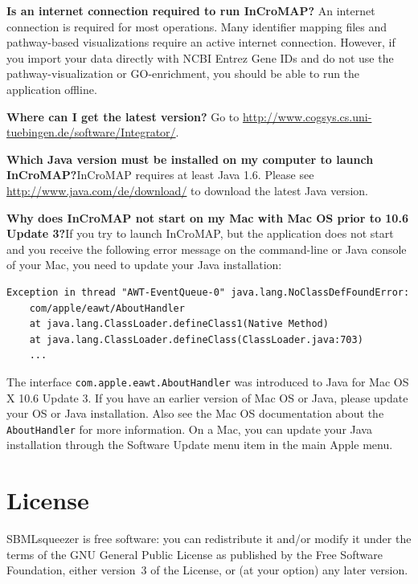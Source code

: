 \noindent \textbf{Is an internet connection required to run InCroMAP?}\newline
An internet connection is required for most operations. Many identifier mapping
files and pathway-based visualizations require an active internet connection.
However, if you import your data directly with NCBI Entrez Gene IDs and do not
use the pathway-visualization or GO-enrichment, you should be able to run the
application offline.\newline

\noindent \textbf{Where can I get the latest version?}\newline
Go to \url{http://www.cogsys.cs.uni-tuebingen.de/software/Integrator/}.\newline

\noindent \textbf{Which Java version must be installed on my computer to launch
InCroMAP?}\newline InCroMAP requires at least Java 1.6. Please see
\url{http://www.java.com/de/download/} to download the latest Java version.

\noindent \textbf{Why does InCroMAP not start on my Mac with Mac OS prior to
10.6 Update 3?}\newline If you try to launch InCroMAP, but the application does
not start and you receive the following error message on the command-line or
Java console of your Mac, you need to update your Java installation:
\begin{verbatim}
Exception in thread "AWT-EventQueue-0" java.lang.NoClassDefFoundError:
    com/apple/eawt/AboutHandler
    at java.lang.ClassLoader.defineClass1(Native Method)
    at java.lang.ClassLoader.defineClass(ClassLoader.java:703)
    ...
\end{verbatim}
The interface \texttt{com.apple.eawt.AboutHandler} was introduced to Java for
Mac OS X 10.6 Update 3. If you have an earlier version of Mac OS or Java,
please update your OS or Java installation. Also see the Mac OS documentation
about the \texttt{AboutHandler} for more information. On a Mac, you can update
your Java installation through the Software Update menu item in the main Apple
menu.

\chapter{License}

SBMLsqueezer is free software: you can redistribute it and/or modify
it under the terms of the GNU General Public License as published by
the Free Software Foundation, either version~3 of the License, or
(at your option) any later version.

